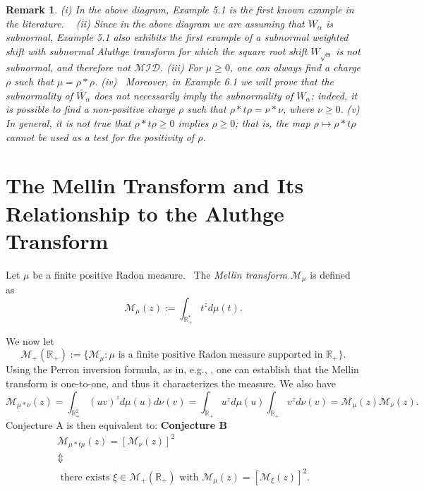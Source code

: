 \documentclass[12pt]{amsart}
\newtheorem{rem}[thm]{Remark}
\begin{document}
\begin{rem}
(i) In the above diagram, Example 5.1 is the first known example in the literature. \ \newline
(ii) Since in the above diagram we are assuming that $W_\alpha$ is subnormal, Example 5.1 also exhibits the first example of a subnormal weighted shift with subnormal Aluthge transform for which the square root shift $W_{\sqrt{\alpha}}$ is not subnormal, and therefore not $\mathcal{MID}$. \newline
(iii) For $\mu \ge 0$, one can always find a charge $\rho$ such that $\mu = \rho * \rho$. \newline
(iv) \ Moreover, in Example 6.1 we will prove that the subnormality of $\widetilde{W_\alpha}$ does not necessarily imply the subnormality of $W_\alpha$; indeed, it is possible to find a non-positive charge $\rho$ such that $\rho* t \rho = \nu * \nu$, where $\nu \ge 0$. \newline
(v) In general, it is not true that $\rho * t \rho \ge 0$ implies $\rho \ge 0$; that is, the map $\rho \mapsto \rho * t \rho$ cannot be used as a test for the positivity of $\rho$. 
\end{rem}
\bigskip



\section{The Mellin Transform and Its Relationship to the Aluthge Transform}

Let $\mu$ be a finite positive Radon measure. \ The {\it Mellin transform} $\mathcal{M}_\mu$ is defined as
\begin{equation}\label{Mellindef}
    \mathcal{M}_\mu(z):=\int_{\mathbb{R}_+^*} t^z d\mu(t). 
\end{equation}

We now let 
$$
\mathcal{M}_+(\mathbb{R}_+):= \{ \mathcal{M}_\mu : \mu  \mbox{ is a finite positive Radon measure supported in } \mathbb{R}_+\}.
$$
Using the Perron inversion formula, as in, e.g., \cite[VI Theorem 9b]{Wid}, one can establish that the Mellin transform is one-to-one, and thus it characterizes the measure.
We also have
$$
\mathcal{M}_{\mu*\nu}(z)=\int_{\mathbb{R}_+^2} (uv)^z d\mu(u)d\nu(v)=\int_{\mathbb{R}_+} u^z d\mu(u)\int_{\mathbb{R}_+} v^z d\nu(v)=\mathcal{M}_{\mu}(z)\mathcal{M}_{\nu}(z).
$$
Conjecture A is then equivalent to: \newline \vspace{4pt} {\bf Conjecture B}
\begin{equation} \label{Conjecture B}
\begin{array}{c}
    \mathcal{M}_{\mu*t\mu}(z)=[\mathcal{M}_{\nu}(z)]^2 \\
     \Updownarrow\\
     \textrm{ there exists } \xi \in \mathcal{M}_+(\mathbb{R}_+) \textrm{ with } \mathcal{M}_{\mu}(z)=[\mathcal{M}_{\xi}(z)]^2.  
\end{array}   
\end{equation}
\end{document}
